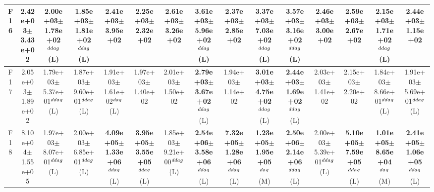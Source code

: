 \begin{table}[!t]
\begin{tabular}{c|cccccccccccccc}
F16  & 2.42e+03$\pm$3.43e+02  & 2.00e+03$\pm$1.78e+02$^{\\ddag}$ (L)  & 1.85e+03$\pm$1.81e+02$^{\\ddag}$ (L)  & 2.41e+03$\pm$3.95e+02   & 2.25e+03$\pm$2.32e+02   & 2.61e+03$\pm$3.26e+02   & \textbf{3.61e+03$\pm$5.96e+02}$^{\\ddag}$ (L)  & 2.37e+03$\pm$2.85e+02   & \textbf{3.37e+03$\pm$7.03e+02}$^{\\ddag}$ (L)  & \textbf{3.57e+03$\pm$3.16e+02}$^{\\ddag}$ (L)  & 2.46e+03$\pm$3.00e+02   & 2.59e+03$\pm$2.67e+02   & 2.15e+03$\pm$1.71e+02$^{\\ddag}$ (L)  & 2.44e+03$\pm$1.15e+02  \\ \hline
F17  & 2.05e+03$\pm$1.89e+02  & 1.79e+03$\pm$5.37e+01$^{\\ddag}$ (L)  & 1.87e+03$\pm$9.60e+01$^{\\ddag}$ (L)  & 1.91e+03$\pm$1.61e+02$^{\\dag}$ (L)  & 1.97e+03$\pm$1.40e+02   & 2.01e+03$\pm$1.50e+02   & \textbf{2.79e+03$\pm$3.67e+02}$^{\\ddag}$ (L)  & 1.94e+03$\pm$1.14e+02   & \textbf{3.01e+03$\pm$4.75e+02}$^{\\ddag}$ (L)  & \textbf{2.44e+03$\pm$1.69e+02}$^{\\ddag}$ (L)  & 2.03e+03$\pm$1.41e+02   & 2.15e+03$\pm$2.20e+02   & 1.84e+03$\pm$8.66e+01$^{\\ddag}$ (L)  & 1.91e+03$\pm$5.69e+01$^{\\ddag}$ (L) \\ \hline
F18  & 8.10e+04$\pm$1.55e+05  & 1.97e+03$\pm$8.07e+01$^{\\ddag}$ (L)  & 2.00e+03$\pm$6.85e+01$^{\\ddag}$ (L)  & \textbf{4.09e+05$\pm$1.33e+06}$^{\\ddag}$ (L)  & \textbf{3.95e+05$\pm$3.55e+05}$^{\\ddag}$ (L)  & 1.85e+03$\pm$9.21e+00$^{\\ddag}$ (L)  & \textbf{2.54e+06$\pm$3.58e+06}$^{\\ddag}$ (L)  & \textbf{7.32e+05$\pm$1.28e+06}$^{\\ddag}$ (L)  & \textbf{1.23e+05$\pm$1.95e+05}$^{\\dag}$ (M)  & \textbf{2.50e+06$\pm$2.14e+06}$^{\\ddag}$ (L)  & 2.00e+03$\pm$5.39e+01$^{\\ddag}$ (L)  & \textbf{5.10e+05$\pm$7.59e+05}$^{\\ddag}$ (L)  & \textbf{1.01e+05$\pm$8.65e+04}$^{\\dag}$ (M)  & \textbf{2.41e+05$\pm$1.06e+05}$^{\\ddag}$ (L) \\ \hline

\end{tabular}
\end{table}
